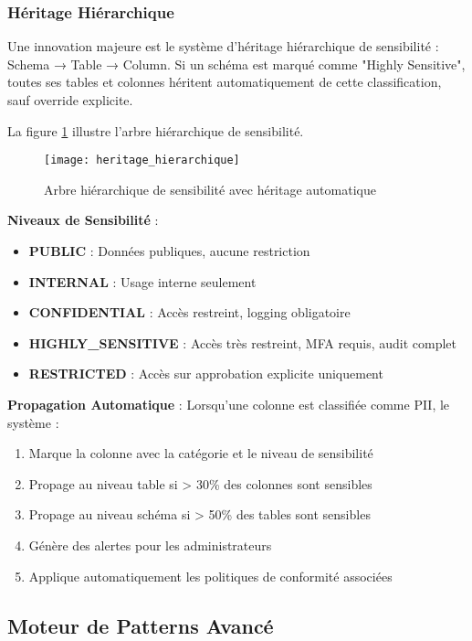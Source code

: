 \subsubsection{Héritage Hiérarchique}

Une innovation majeure est le système d'héritage hiérarchique de sensibilité : Schema → Table → Column. Si un schéma est marqué comme "Highly Sensitive", toutes ses tables et colonnes héritent automatiquement de cette classification, sauf override explicite.

La figure \ref{fig:heritage_hierarchique} illustre l'arbre hiérarchique de sensibilité.

\begin{figure}[htpb]
\centering
\texttt{[image: heritage\_hierarchique]}
\caption{Arbre hiérarchique de sensibilité avec héritage automatique}
\label{fig:heritage_hierarchique}
\end{figure}

\textbf{Niveaux de Sensibilité} :
\begin{itemize}
    \item \textbf{PUBLIC} : Données publiques, aucune restriction
    \item \textbf{INTERNAL} : Usage interne seulement
    \item \textbf{CONFIDENTIAL} : Accès restreint, logging obligatoire
    \item \textbf{HIGHLY\_SENSITIVE} : Accès très restreint, MFA requis, audit complet
    \item \textbf{RESTRICTED} : Accès sur approbation explicite uniquement
\end{itemize}

\textbf{Propagation Automatique} : Lorsqu'une colonne est classifiée comme PII, le système :
\begin{enumerate}
    \item Marque la colonne avec la catégorie et le niveau de sensibilité
    \item Propage au niveau table si > 30\% des colonnes sont sensibles
    \item Propage au niveau schéma si > 50\% des tables sont sensibles
    \item Génère des alertes pour les administrateurs
    \item Applique automatiquement les politiques de conformité associées
\end{enumerate}

\subsection{Moteur de Patterns Avancé}

